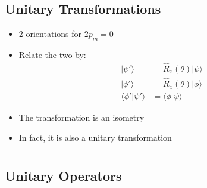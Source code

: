 \documentclass[a4paper,11pt,normalem]{article}
\begin{document}
\subsection{Unitary Transformations}\label{unitary-transformations}

\begin{itemize}
\item
  2 orientations for \(2p_m = 0\)
\item
  Relate the two by:
\[
    \begin{aligned}
    |\psi'\rangle &= \hat{R}_x(\theta)|\psi\rangle \\
    |\phi'\rangle &= \hat{R}_x(\theta)|\phi\rangle \\
    \langle\phi'|\psi'\rangle &= \langle\phi|\psi\rangle
    \end{aligned}
\]
\item
  The transformation is an isometry
\item
  In fact, it is also a unitary transformation
\end{itemize}

\section{}\label{lecture-13}

\subsection{Unitary Operators}\label{unitary-operators}
\end{document}
